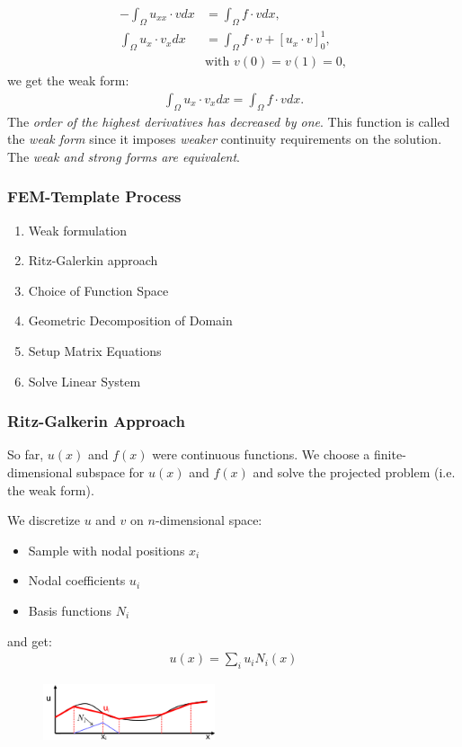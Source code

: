 \begin{multicols}{2}
\begin{align*}
	-\int_\Omega u_{xx} \cdot v dx &= \int_\Omega f \cdot v dx,\\
	\int_\Omega u_x \cdot v_x dx &= \int_\Omega f\cdot v + [u_x\cdot v]_0^1,\\
&\text{with } v(0) = v(1) = 0,
\end{align*}
we get the weak form:
\begin{align*}
	\int_\Omega u_x\cdot v_x dx = \int_\Omega f\cdot v dx.
\end{align*}
The \emph{order of the highest derivatives has decreased by one}. This function is called the \emph{weak form} since it imposes \emph{weaker} continuity requirements on the solution. The \emph{weak and strong forms are equivalent}.

\subsubsection{FEM-Template Process}
\begin{enumerate}
	\item Weak formulation
	\item Ritz-Galerkin approach
	\item Choice of Function Space 
	\item Geometric Decomposition of Domain
	\item Setup Matrix Equations
	\item Solve Linear System
\end{enumerate}

\subsubsection{Ritz-Galkerin Approach}
So far, $u(x)$ and $f(x)$ were continuous functions. We choose a finite-dimensional subspace for $u(x)$ and $f(x)$ and solve the projected problem (i.e. the weak form). 

We discretize $u$ and $v$ on $n$-dimensional space:
\begin{itemize}
	\item Sample with nodal positions $x_i$
	\item Nodal coefficients $u_i$
	\item Basis functions $N_i$
\end{itemize}
and get:
\begin{align*}
u(x) = \sum_i u_i N_i(x)
\end{align*}

\begin{figure}[H]
	\centering
	\includegraphics[width=0.45\textwidth]{img/03_galerkin_sampling}
\end{figure}



\end{multicols}
